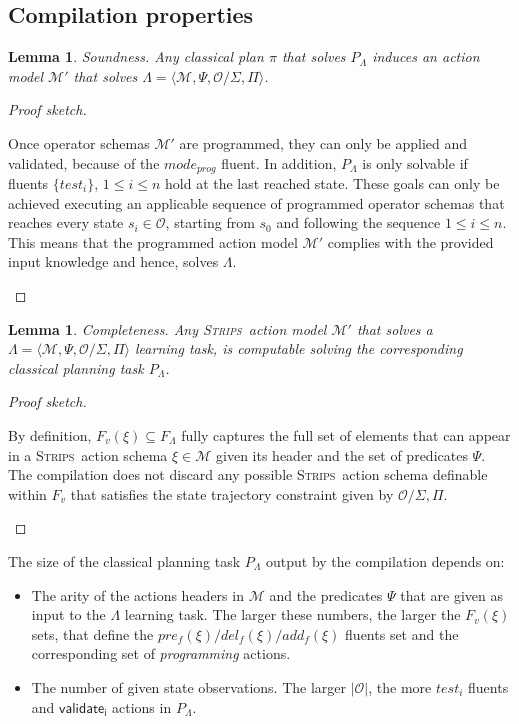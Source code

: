 \documentclass[3p,times]{elsarticle}
\newtheorem{mylemma}[mytheorem]{Lemma}
\newcommand{\strips}{\textsc{Strips}}     %
\newcommand{\tup}[1]{{\langle #1 \rangle}}
\begin{document}
\subsection{Compilation properties}

\begin{mylemma}
Soundness. Any classical plan $\pi$ that solves $P_{\Lambda}$ induces an action model $\mathcal{M}'$ that solves $\Lambda=\tup{\mathcal{M},\Psi,\mathcal{O}/\Sigma,\Pi}$.
\end{mylemma}

\begin{proof}[Proof sketch]
\begin{small}
Once operator schemas $\mathcal{M}'$ are programmed, they can only be applied and validated, because of the $mode_{prog}$ fluent. In addition, $P_{\Lambda}$ is only solvable if fluents $\{test_i\}$, {\small $1\leq i\leq n$} hold at the last reached state. These goals can only be achieved executing an applicable sequence of programmed operator schemas that reaches every state $s_i\in\mathcal{O}$, starting from $s_0$ and following the sequence {\small $1\leq i\leq n$}. This means that the programmed action model $\mathcal{M}'$ complies with the provided input knowledge and hence, solves $\Lambda$.
\end{small}
\end{proof}


\begin{mylemma}
Completeness. Any \strips\ action model $\mathcal{M}'$ that solves a $\Lambda=\tup{\mathcal{M},\Psi,\mathcal{O}/\Sigma,\Pi}$ learning task, is computable solving the corresponding classical planning task $P_{\Lambda}$.
\end{mylemma}

\begin{proof}[Proof sketch]
\begin{small}
By definition, $F_v(\xi)\subseteq F_\Lambda$ fully captures the full set of elements that can appear in a \strips\ action schema $\xi\in\mathcal{M}$ given its header and the set of predicates $\Psi$. The compilation does not discard any possible \strips\ action schema definable within $F_v$ that satisfies the state trajectory constraint given by $\mathcal{O}/\Sigma,\Pi$.
\end{small}
\end{proof}

The size of the classical planning task $P_{\Lambda}$ output by the compilation depends on:
\begin{itemize}
\item The arity of the actions headers in $\mathcal{M}$ and the predicates $\Psi$ that are given as input to the $\Lambda$ learning task. The larger these numbers, the larger the $F_v(\xi)$ sets, that define the $pre_f(\xi)/del_f(\xi)/add_f(\xi)$ fluents set and the corresponding set of {\em programming} actions.
\item The number of given state observations. The larger $|\mathcal{O}|$, the more $test_i$ fluents and $\mathsf{validate_{i}}$ actions in $P_{\Lambda}$.
\end{itemize}
\end{document}
